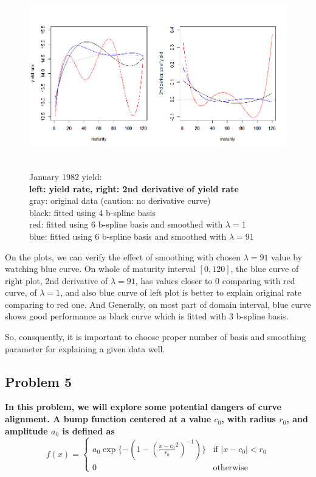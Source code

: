 \documentclass{article}
\begin{document}
\begin{figure}[hh]
    \centering
    \includegraphics[height=8cm]{1982Jyield_comp_plot.png}
    \caption{January 1982 yield:\\
        \textbf{left: yield rate, right: 2nd derivative of yield rate}\\
        gray: original data (caution: no derivative curve)\\
        black: fitted using 4 b-spline basis\\
        red: fitted using 6 b-spline basis and smoothed with $\lambda=1$\\
        blue: fitted using 6 b-spline basis and smoothed with $\lambda=91$\\
        }
\end{figure}

On the plots, we can verify the effect of smoothing with chosen $\lambda=91$ value by watching blue curve.
On whole of maturity interval $[0,120]$, the blue curve of right plot, 2nd derivative of $\lambda=91$, has values closer to 0 comparing with red curve, of $\lambda=1$,
and also blue curve of left plot is better to explain original rate comparing to red one.
And Generally, on most part of domain interval, blue curve shows good performance as black curve which is fitted with 3 b-spline basis.

So, consquently, it is important to choose proper number of basis and smoothing parameter for explaining a given data well.



\newpage
\subsection{Problem 5}
\textbf{
In this problem, we will explore some potential dangers of curve alignment. 
A bump function centered at a value $c_0$, with radius $r_0$, and amplitude $a_0$ is defined as 
}
\begin{equation*}
    f(x) = \begin{cases}
        a_0\exp{\{-(1-(\frac{x-c_0}{r_0}^2)^{-1})\}} &\text{if } |x-c_0|<r_0 \\
        0 &\text{otherwise}
    \end{cases}
\end{equation*}
\end{document}
